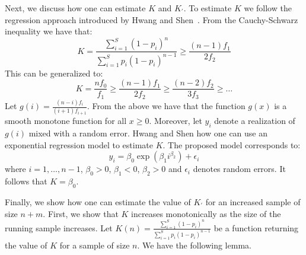Next, we discuss how one can estimate $K$ and $K_{\prime}$. To estimate $K$ we follow the regression approach introduced by Hwang and Shen~\cite{hwang:2010}. From the Cauchy-Schwarz inequality we have that:
\begin{equation}
K = \frac{\sum_{i=1}^S (1-p_i)^n}{\sum_{i=1}^S p_i(1-p_i)^{n-1}} \geq \frac{(n-1)f_1}{2f_2}
\end{equation}
This can be generalized to:
\begin{equation}
K=\frac{nf_0}{f_1} \geq \frac{(n-1)f_1}{2f_2} \geq \frac{(n-2)f_2}{3f_3} \geq \dots
\end{equation}
Let $g(i) = \frac{(n-i)f_i}{(i+1)f_{i+1}}$. From the above we have that the function $g(x)$ is a smooth monotone function for all $x \geq 0$. Moreover, let $y_i$ denote a realization of $g(i)$ mixed with a random error. Hwang and Shen how one can use an exponential regression model to estimate $K$. The proposed model corresponds to:
\begin{equation}
y_i = \beta_0\exp(\beta_1i^{\beta_2}) + \epsilon_i
\end{equation}
where $i = 1, \dots, n-1$, $\beta_0 > 0$, $\beta_1 < 0$, $\beta_2 >0$ and $\epsilon_i$ denotes random errors. It follows that $K = \beta_0$. 

Finally, we show how one can estimate the value of $K_\prime$ for an increased sample of size $n+m$. First, we show that $K$ increases monotonically as the size of the running sample increases. Let $K(n) = \frac{\sum_{i=1}^S (1-p_i)^n}{\sum_{i=1}^S p_i(1-p_i)^{n-1}}$ be a function returning the value of $K$ for a sample of size $n$. We have the following lemma. 

